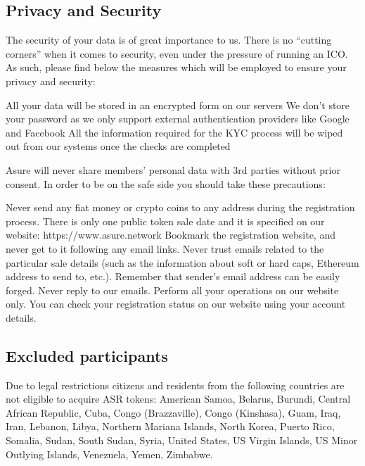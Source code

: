 \subsection{Privacy and Security}
The security of your data is of great importance to us. There is no “cutting corners” when it comes to security, even under the pressure of running an ICO.  As such, please find below the measures which will be employed to ensure your privacy and security: 

All your data will be stored in an encrypted form on our servers
We don’t store your password as we only support external authentication providers like Google and Facebook
All the information required for the KYC process will be wiped out from our systems once the checks are completed

Asure will never share members’ personal data with 3rd parties without prior consent. In order to be on the safe side you should take these precautions: 

Never send any fiat money or crypto coins to any address during the registration process. There is only one public token sale date and it is specified on our 
website: https://www.asure.network
Bookmark the registration website, and never get to it following any email links.
Never trust emails related to the particular sale details (such as the information about soft or hard caps, Ethereum address to send to, etc.). Remember that sender’s email address can be easily forged. 
Never reply to our emails. Perform all your operations on our website only. You can check your registration status on our website using your account details. 


\subsection{Excluded participants}
Due to legal restrictions citizens and residents from the following countries are not eligible to acquire ASR tokens: American Samoa, Belarus, Burundi, Central African Republic, Cuba, Congo (Brazzaville), Congo (Kinshasa), Guam, Iraq, Iran, Lebanon, Libya, Northern Mariana Islands, North Korea, Puerto Rico, Somalia, Sudan, South Sudan, Syria, United States, US Virgin Islands, US Minor Outlying Islands, Venezuela, Yemen, Zimbabwe.

